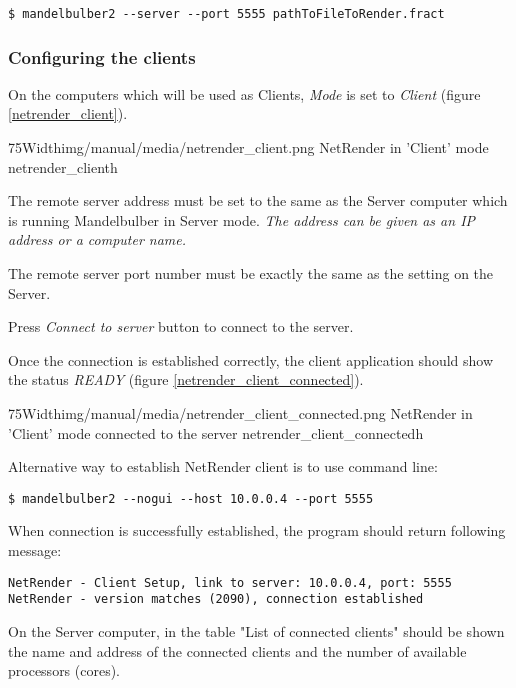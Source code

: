 \begin{verbatim} 
$ mandelbulber2 --server --port 5555 pathToFileToRender.fract
\end{verbatim}

\subsubsection{Configuring the clients}\label{configuring-the-clients}

On the computers which will be used as Clients, \emph{Mode} is set to
\emph{Client} (figure \ref{netrender_client}).

\simpleImageWithCaption75Width{img/manual/media/netrender_client.png}
{NetRender in 'Client' mode}
{netrender_client}{h}

The remote server address must be set to the same as the Server computer which
is running Mandelbulber in Server mode. \emph{The address can be given as an IP
address or a computer name.}

The remote server port number must be exactly the same as the setting on the
Server.

Press \emph{Connect to server} button to connect to the server.

Once the connection is established correctly, the client application should show
the status \emph{READY} (figure \ref{netrender_client_connected}).

\simpleImageWithCaption75Width{img/manual/media/netrender_client_connected.png}
{NetRender in 'Client' mode connected to the server}
{netrender_client_connected}{h}

Alternative way to establish NetRender client is to use command line:

\begin{verbatim} 
$ mandelbulber2 --nogui --host 10.0.0.4 --port 5555
\end{verbatim}

When connection is successfully established, the program should return following
message:

\begin{verbatim} 
NetRender - Client Setup, link to server: 10.0.0.4, port: 5555
NetRender - version matches (2090), connection established 
\end{verbatim}

On the Server computer, in the table "List of connected clients" should be shown
the name and address of the connected clients and the number of available
processors (cores).

